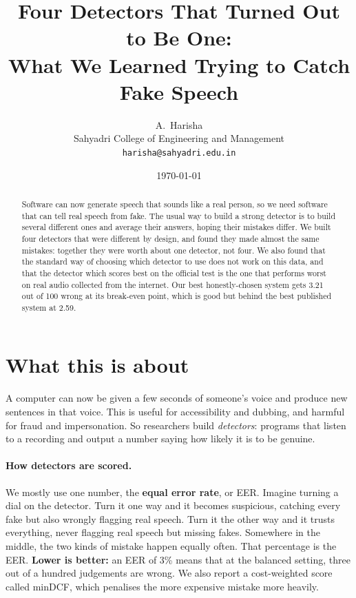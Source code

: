 \documentclass[11pt,a4paper]{article}
\title{\bf Four Detectors That Turned Out to Be One:\\
What We Learned Trying to Catch Fake Speech}
\author{A.\ Harisha\\[2pt]
\small Sahyadri College of Engineering and Management\\
\small \texttt{harisha@sahyadri.edu.in}}
\date{\today}
\begin{document}
\maketitle

\begin{abstract}
\noindent
Software can now generate speech that sounds like a real person, so we need software that can tell
real speech from fake. The usual way to build a strong detector is to build several different ones
and average their answers, hoping their mistakes differ. We built four detectors that were different
by design, and found they made almost the same mistakes: together they were worth about one
detector, not four. We also found that the standard way of choosing which detector to use does not
work on this data, and that the detector which scores best on the official test is the one that
performs worst on real audio collected from the internet. Our best honestly-chosen system gets 3.21
out of 100 wrong at its break-even point, which is good but behind the best published system at
2.59.
\end{abstract}

\section{What this is about}

A computer can now be given a few seconds of someone's voice and produce new sentences in that
voice. This is useful for accessibility and dubbing, and harmful for fraud and impersonation. So
researchers build \emph{detectors}: programs that listen to a recording and output a number saying
how likely it is to be genuine.

\paragraph{How detectors are scored.} We mostly use one number, the \textbf{equal error rate}, or
EER. Imagine turning a dial on the detector. Turn it one way and it becomes suspicious, catching
every fake but also wrongly flagging real speech. Turn it the other way and it trusts everything,
never flagging real speech but missing fakes. Somewhere in the middle, the two kinds of mistake
happen equally often. That percentage is the EER. \textbf{Lower is better:} an EER of 3\% means that
at the balanced setting, three out of a hundred judgements are wrong. We also report a cost-weighted
score called minDCF, which penalises the more expensive mistake more heavily.
\end{document}
